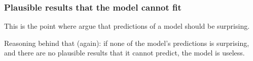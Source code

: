 \documentclass{beamer}
\begin{document}
\begin{frame}
  \frametitle{Plausible results that the model cannot fit}

  This is the point where \cite{RobertsPashler2000} argue that predictions of a model should be surprising.

  Reasoning behind that (again): if none of the model's predictions is surprising, and there are no plausible
  results that it cannot predict, the model is useless.
\end{frame}



\end{document}
